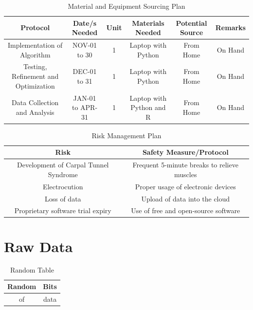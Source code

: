 \documentclass{strrespaper-trad}
\begin{document}
\begin{landscape}
			\begin{table}[htbp]
				\centering
				\caption{Material and Equipment Sourcing Plan}
				\label{tab:material_equipment_sourcing}
				\begin{tabular}{cccccc}
					\toprule
					Protocol                             & Date/s Needed    & Unit & Materials Needed         & Potential Source & Remarks \\
					\midrule
					Implementation of Algorithm          & NOV-01 to 30     & 1    & Laptop with Python       & From Home        & On Hand \\
					Testing, Refinement and Optimization & DEC-01 to 31     & 1    & Laptop with Python       & From Home        & On Hand \\
					Data Collection and Analysis         & JAN-01 to APR-31 & 1    & Laptop with Python and R & From Home        & On Hand \\
					\bottomrule
				\end{tabular}
			\end{table}

			\begin{table}[htbp]
				\centering
				\caption{Risk Management Plan}
				\label{tab:risk_management}
				\begin{tabularx}{\textwidth}{cc}
					\toprule
					Risk                                  & Safety Measure/Protocol                     \\
					\midrule
					Development of Carpal Tunnel Syndrome & Frequent 5-minute breaks to relieve muscles \\
					Electrocution                         & Proper usage of electronic devices          \\
					Loss of data                          & Upload of data into the cloud               \\
					Proprietary software trial expiry     & Use of free and open-source software        \\
					\bottomrule
				\end{tabularx}
			\end{table}
		\end{landscape}

	\chapter{Raw Data}
		\begin{table}[htbp]
			\centering
			\caption{Random Table}
			\label{tab:random}
			\begin{tabular}{cc}
				\toprule
				Random & Bits \\
				\midrule
				of     & data \\
				\bottomrule
			\end{tabular}
		\end{table}
		\lstset{language=Python, breaklines=true, numbers=left, stringstyle=\ttfamily\small, basicstyle=\singlespacing}
\end{document}
